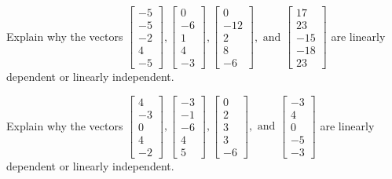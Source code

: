 \documentclass{article}
\begin{document}
\begin{exerciseStatement}
    Explain why the vectors \(\left[\begin{array}{r}
-5 \\
-5 \\
-2 \\
4 \\
-5
\end{array}\right] , \left[\begin{array}{r}
0 \\
-6 \\
1 \\
4 \\
-3
\end{array}\right] , \left[\begin{array}{r}
0 \\
-12 \\
2 \\
8 \\
-6
\end{array}\right] , \text{ and } \left[\begin{array}{r}
17 \\
23 \\
-15 \\
-18 \\
23
\end{array}\right]\) are linearly dependent or linearly independent.


  
\end{exerciseStatement}

\begin{exerciseStatement}
    Explain why the vectors \(\left[\begin{array}{r}
4 \\
-3 \\
0 \\
4 \\
-2
\end{array}\right] , \left[\begin{array}{r}
-3 \\
-1 \\
-6 \\
4 \\
5
\end{array}\right] , \left[\begin{array}{r}
0 \\
2 \\
3 \\
3 \\
-6
\end{array}\right] , \text{ and } \left[\begin{array}{r}
-3 \\
4 \\
0 \\
-5 \\
-3
\end{array}\right]\) are linearly dependent or linearly independent.


  
\end{exerciseStatement}
\end{document}
